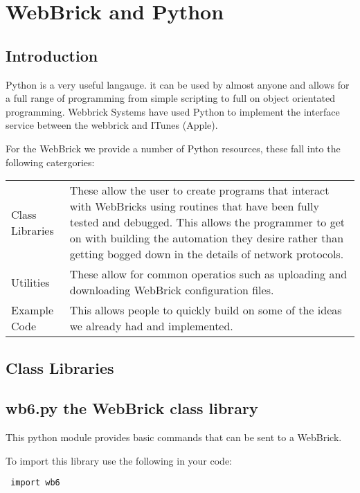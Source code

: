 \section{WebBrick and Python}

\subsection{Introduction}

Python is a very useful langauge. it can be used by almost anyone and allows for a full range of programming 
from simple scripting to full on object orientated programming. Webbrick Systems have used Python to implement 
the interface service between the webbrick and ITunes (Apple).

For the WebBrick we provide a number of Python resources, these fall into the following catergories:

\begin{tabular}{l|p{12cm}}

	Class Libraries&These allow the user to create programs that interact with WebBricks
				using routines that have been fully tested and debugged.  This allows
				the programmer to get on with building the automation they desire rather
				than getting bogged down in the details of network protocols.\\
	Utilities&These allow for common operatios such as uploading and downloading
				WebBrick configuration files.\\
	Example Code&This allows people to quickly build on some of the ideas we already had and
				implemented.\\
\end{tabular}

\subsection{Class Libraries}

\subsection{wb6.py the WebBrick class library}

This python module provides basic commands that can be sent to a WebBrick.

To import this library use the following in your code:

\begin{verbatim} import wb6 \end{verbatim}

